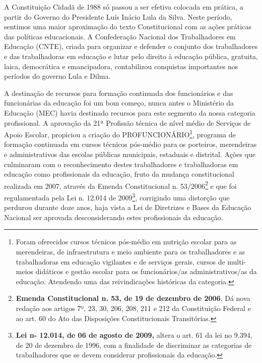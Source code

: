 A Constituição Cidadã de 1988 só passou a ser efetiva colocada em
prática, a partir do Governo do Presidente Luís Inácio Lula da Silva.
Neste período, sentimos uma maior aproximação do texto Constitucional
com as ações práticas das políticas educacionais. A Confederação
Nacional dos Trabalhadores em Educação (CNTE), criada para organizar e
defender o conjunto dos trabalhadores e das trabalhadoras em educação e
lutar pelo direito à educação pública, gratuita, laica, democrática e
emancipadora, contabilizou conquistas importantes nos períodos do
governo Lula e Dilma.

A destinação de recursos para formação continuada dos funcionários e das
funcionárias da educação foi um bom começo, nunca antes o Ministério da
Educação (MEC) havia destinado recursos para este segmento da nossa
categoria profissional. A aprovação da 21ª Profissão técnica de nível
médio de Serviços de Apoio Escolar, propiciou a criação do
PROFUNCIONÁRIO\footnote{Foram oferecidos cursos técnicos pós-médio em
  nutrição escolar para as merendeiras, de infraestrutura e meio
  ambiente para os trabalhadores e as trabalhadoras em educação
  vigilantes e de serviços gerais, cursos de multi-meios didáticos e
  gestão escolar para os funcionários/as administrativos/as da educação.
  Atendendo uma das reivindicações históricas da categoria.}, programa
de formação continuada em cursos técnicos pós-médio para os porteiros,
merendeiras e administrativos das escolas públicas municipais, estaduais
e distrital. Ações que culminaram com o reconhecimento destes
trabalhadores e trabalhadoras em educação como profissionais da
educação, fruto da mudança constitucional realizada em 2007, através da
Emenda Constitucional n. 53/2006\footnote{\textbf{Emenda Constitucional
  n. 53, de 19 de dezembro de 2006}, Dá nova redação aos artigos 7º, 23,
  30, 206, 208, 211 e 212 da Constituição Federal e ao art. 60 do Ato
  das Disposições Constitucionais Transitórias.} e que foi regulamentada
pela Lei n. 12.014 de 2009\footnote{\textbf{Lei n- 12.014, de 06 de
  agosto de 2009,} altera o art. 61 da lei no 9.394, de 20 de dezembro
  de 1996, com a finalidade de discriminar as categorias de
  trabalhadores que se devem considerar profissionais da educação.},
corrigindo uma distorção que perdurou durante doze anos, haja vista a
Lei de Diretrizes e Bases da Educação Nacional ser aprovada
desconsiderando estes profissionais da educação.


